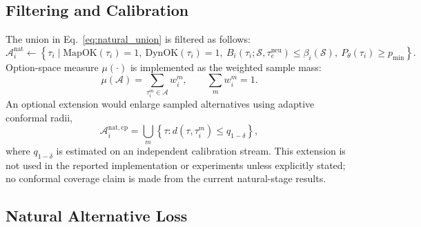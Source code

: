 \documentclass[10pt]{article}
\begin{document}
\subsection{Filtering and Calibration}
\label{app:natural_filtering}

The union in Eq.~\eqref{eq:natural_union} is filtered as follows:
\begin{equation}
    \mathcal{A}^{\mathrm{nat}}_i
    \leftarrow
    \left\{
    \tau_i
    \mid
    \mathrm{MapOK}(\tau_i)=1,\ 
    \mathrm{DynOK}(\tau_i)=1,\ 
    B_i(\tau_i;\mathcal{S},\tau^{\mathrm{neu}}_e)\le \beta_i(\mathcal{S}),\
    P_\theta(\tau_i)\ge p_{\min}
    \right\}.
\end{equation}
Option-space measure $\mu(\cdot)$ is implemented as the weighted sample mass:
\begin{equation}
    \mu(\mathcal{A})
    =
    \sum_{\tau_i^m\in\mathcal{A}} w_i^m,
    \qquad
    \sum_m w_i^m=1 .
\end{equation}
An optional extension would enlarge sampled alternatives using adaptive conformal radii,
\begin{equation}
    \mathcal{A}^{\mathrm{nat,cp}}_i
    =
    \bigcup_m
    \left\{
    \tau:
    d(\tau,\tau_i^m)\le q_{1-\delta}
    \right\},
\end{equation}
where $q_{1-\delta}$ is estimated on an independent calibration stream. This extension is not used in the reported implementation or experiments unless explicitly stated; no conformal coverage claim is made from the current natural-stage results.

\subsection{Natural Alternative Loss}
\label{app:natural_loss}
\end{document}

